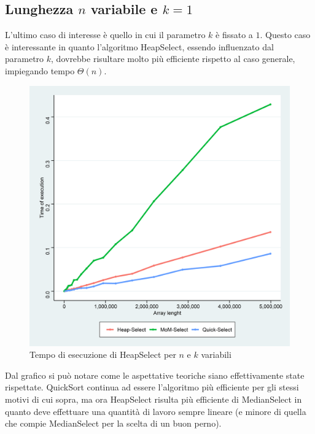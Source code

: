 \documentclass{article}
\begin{document}
	\newpage
	
	
	\subsection{Lunghezza $n$ variabile e $k=1$}
	L'ultimo caso di interesse è quello in cui il parametro $k$ è fissato a $1$. Questo caso è interessante in quanto l'algoritmo HeapSelect, essendo influenzato dal parametro $k$, dovrebbe risultare molto più efficiente rispetto al caso generale, impiegando tempo $\Theta\left(n\right)$.
	
	\begin{figure}[h!]
  		\includegraphics[width=\linewidth]{images/Grafico_Con_K1.png}
  		\caption{Tempo di esecuzione di HeapSelect per $n$ e $k$ variabili}
  		\label{fig:graph6}
	\end{figure}
	
	Dal grafico si può notare come le aspettative teoriche siano effettivamente state rispettate. QuickSort continua ad essere l'algoritmo più efficiente per gli stessi motivi di cui sopra, ma ora HeapSelect risulta più efficiente di MedianSelect in quanto deve effettuare una quantità di lavoro sempre lineare (e minore di quella che compie MedianSelect per la scelta di un buon perno).
	
	
	\newpage
\end{document}
